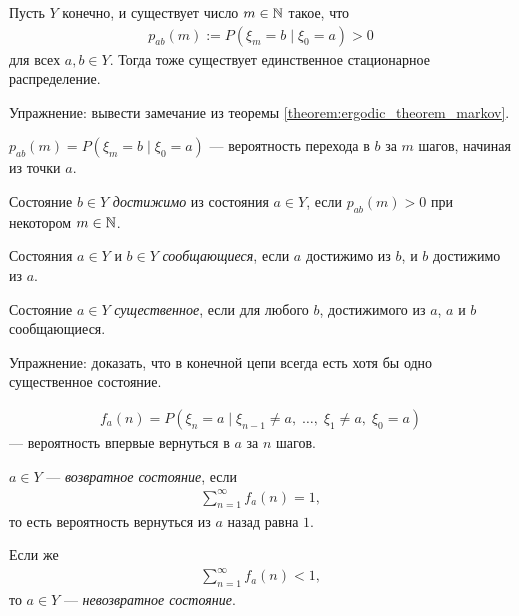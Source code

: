 \documentclass[../main.tex]{subfiles}
\begin{document}
\begin{remrk}
 Пусть $ Y $ конечно, и существует число $ m \in \mathbb{N} $ такое, что
 \begin{align*}
  p_{ab}(m) := P(\xi_m = b \mid \xi_0 = a) > 0
 \end{align*} для всех $ a,b \in Y $. Тогда тоже существует единственное стационарное распределение.
\end{remrk}

Упражнение: вывести замечание из теоремы \ref{theorem:ergodic_theorem_markov}.

\begin{notatn*}
 $ p_{ab}(m) = P(\xi_m = b \mid \xi_0 = a) $ --- вероятность перехода в $ b $ за $ m $ шагов, начиная из точки $ a $.
\end{notatn*}

\begin{df}
 Состояние $ b \in Y $ \textit{достижимо} из состояния $ a \in Y $, если $ p_{ab}(m) > 0 $ при некотором $ m \in \mathbb{N} $.
\end{df}

\begin{df}
 Состояния $ a \in Y $ и $ b \in Y $ \textit{сообщающиеся}, если $ a $ достижимо из $ b $, и $ b $ достижимо из $ a $.
\end{df}

\begin{df}
 Состояние $ a \in Y $ \textit{существенное}, если для любого $ b $, достижимого из $ a $, $ a $ и $ b $ сообщающиеся.
\end{df}

Упражнение: доказать, что в конечной цепи всегда есть хотя бы одно существенное состояние.

\begin{notatn*}
 \begin{align*}
  f_a(n) = P(\xi_n=a\mid \xi_{n-1} \neq a,\; \ldots,\; \xi_1 \neq a,\; \xi_0 = a)
 \end{align*} --- вероятность впервые вернуться в $ a $ за $ n $ шагов.
\end{notatn*}

\begin{df}
 $ a \in Y $ --- \textit{возвратное состояние}, если 
 \begin{align*}
  \sum_{n=1}^{\infty} f_a(n) = 1,
 \end{align*} то есть вероятность вернуться из $ a $ назад равна $ 1 $.

 Если же
 \begin{align*}
  \sum_{n=1}^{\infty} f_a(n) < 1,
 \end{align*} то $ a \in Y $ --- \textit{невозвратное состояние}.
\end{df}
\end{document}
